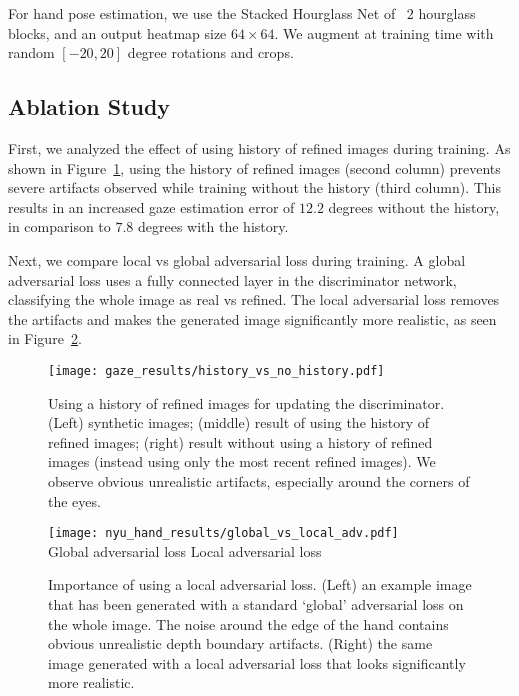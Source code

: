 \documentclass[10pt,twocolumn,letterpaper]{article}
\begin{document}
For hand pose estimation, we use the Stacked Hourglass Net of~\cite{Newell16} $2$ hourglass blocks, and an output heatmap size $64 \times 64$. 
We augment at training time with random $[-20,20]$ degree rotations and crops. 

\subsection{Ablation Study}

First, we analyzed the effect of using history of refined images during training. As shown in Figure~\ref{fig:history_vs_noHistory}, using the history of refined images (second column) prevents severe artifacts observed while training without the history (third column). 
This results in an increased gaze estimation error of $12.2$ degrees without the history, in comparison to $7.8$ degrees with the history.


Next, we compare local vs global adversarial loss during training. A global adversarial loss uses a fully connected layer in the discriminator network, classifying the whole image as real vs refined. The local adversarial loss removes the artifacts and makes the generated image significantly more realistic, as seen in Figure~\ref{fig:global_vs_local}.


\begin{figure}
\centering
\texttt{[image: gaze\_results/history\_vs\_no\_history.pdf]} \\
\caption{Using a history of refined images for updating the discriminator. 
(Left) synthetic images; (middle) result of using the history of refined images; (right) result without using a history of refined images (instead using only the most recent refined images). 
We observe obvious unrealistic artifacts, especially around the corners of the eyes.
}
\label{fig:history_vs_noHistory}
\end{figure}

 \begin{figure}
\centering


\texttt{[image: nyu\_hand\_results/global\_vs\_local\_adv.pdf]} \\
\vskip-0.05in
Global adversarial loss \hskip0.1in Local adversarial loss 
\vskip1pt
\caption{Importance of using a local adversarial loss. 
(Left) an example image that has been generated with a standard `global' adversarial loss on the whole image. 
The noise around the edge of the hand contains obvious unrealistic depth boundary artifacts. 
(Right) the same image generated with a local adversarial loss that looks significantly more realistic. 
}
\label{fig:global_vs_local}
\end{figure}
\end{document}

